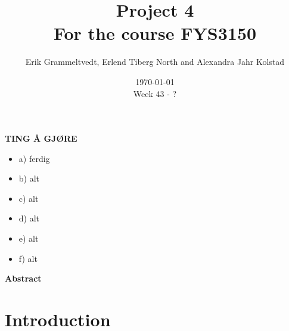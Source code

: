 \documentclass{article}
\begin{document}
\addtocounter{page}{0}

\title{Project 4 \\
      \large For the course FYS3150}
\date{\today \\
    \vspace{1mm}
    \large Week 43 - ?}

\author{Erik Grammeltvedt, Erlend Tiberg North and Alexandra Jahr Kolstad}

\maketitle




\textbf{TING Å GJØRE}
\begin{itemize}
  \item a) ferdig
  \item b) alt
  \item c) alt
  \item d) alt
  \item e) alt
  \item f) alt
\end{itemize}


\vspace{1cm}


\begin{center}

{\Large\textbf{Abstract}} \label{sec:Abstract}

\end{center}



\newpage


\vspace{1cm}

\tableofcontents

\vspace{1cm}

\vspace{1cm}

\section{Introduction} \label{sec:Introduction}
\end{document}
